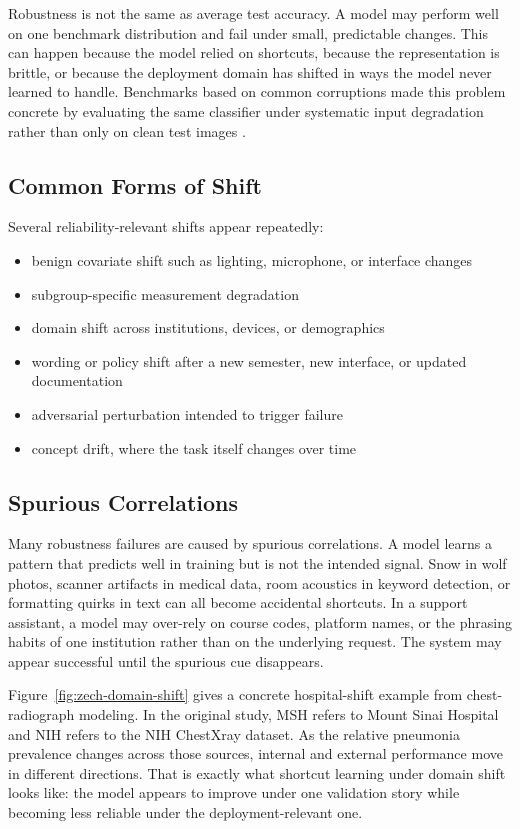 Robustness is not the same as average test accuracy. A model may perform well on one benchmark distribution and fail under small, predictable changes. This can happen because the model relied on shortcuts, because the representation is brittle, or because the deployment domain has shifted in ways the model never learned to handle. Benchmarks based on common corruptions made this problem concrete by evaluating the same classifier under systematic input degradation rather than only on clean test images \citep{hendrycks2019}.

\subsection{Common Forms of Shift}

Several reliability-relevant shifts appear repeatedly:
\begin{itemize}[leftmargin=*]
\item benign covariate shift such as lighting, microphone, or interface changes
\item subgroup-specific measurement degradation
\item domain shift across institutions, devices, or demographics
\item wording or policy shift after a new semester, new interface, or updated documentation
\item adversarial perturbation intended to trigger failure
\item concept drift, where the task itself changes over time
\end{itemize}

\subsection{Spurious Correlations}

Many robustness failures are caused by spurious correlations. A model learns a pattern that predicts well in training but is not the intended signal. Snow in wolf photos, scanner artifacts in medical data, room acoustics in keyword detection, or formatting quirks in text can all become accidental shortcuts. In a support assistant, a model may over-rely on course codes, platform names, or the phrasing habits of one institution rather than on the underlying request. The system may appear successful until the spurious cue disappears.

Figure~\ref{fig:zech-domain-shift} gives a concrete hospital-shift example from chest-radiograph modeling. In the original study, MSH refers to Mount Sinai Hospital and NIH refers to the NIH ChestXray dataset. As the relative pneumonia prevalence changes across those sources, internal and external performance move in different directions. That is exactly what shortcut learning under domain shift looks like: the model appears to improve under one validation story while becoming less reliable under the deployment-relevant one.

